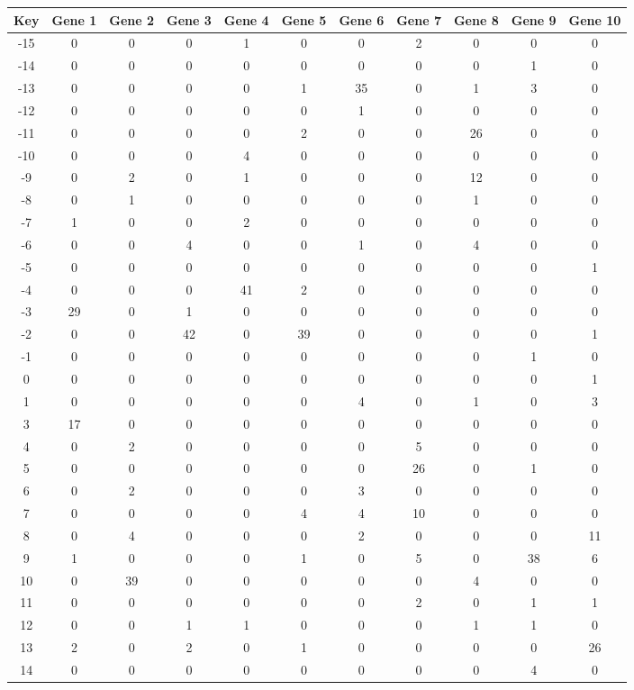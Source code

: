 \begin{tabular}{|c|c|c|c|c|c|c|c|c|c|c|}
\hline
Key & Gene 1 & Gene 2 & Gene 3 & Gene 4 & Gene 5 & Gene 6 & Gene 7 & Gene 8 & Gene 9 & Gene 10 \\
\hline
-15 & 0 & 0 & 0 & 1 & 0 & 0 & 2 & 0 & 0 & 0 \\
-14 & 0 & 0 & 0 & 0 & 0 & 0 & 0 & 0 & 1 & 0 \\
-13 & 0 & 0 & 0 & 0 & 1 & 35 & 0 & 1 & 3 & 0 \\
-12 & 0 & 0 & 0 & 0 & 0 & 1 & 0 & 0 & 0 & 0 \\
-11 & 0 & 0 & 0 & 0 & 2 & 0 & 0 & 26 & 0 & 0 \\
-10 & 0 & 0 & 0 & 4 & 0 & 0 & 0 & 0 & 0 & 0 \\
-9 & 0 & 2 & 0 & 1 & 0 & 0 & 0 & 12 & 0 & 0 \\
-8 & 0 & 1 & 0 & 0 & 0 & 0 & 0 & 1 & 0 & 0 \\
-7 & 1 & 0 & 0 & 2 & 0 & 0 & 0 & 0 & 0 & 0 \\
-6 & 0 & 0 & 4 & 0 & 0 & 1 & 0 & 4 & 0 & 0 \\
-5 & 0 & 0 & 0 & 0 & 0 & 0 & 0 & 0 & 0 & 1 \\
-4 & 0 & 0 & 0 & 41 & 2 & 0 & 0 & 0 & 0 & 0 \\
-3 & 29 & 0 & 1 & 0 & 0 & 0 & 0 & 0 & 0 & 0 \\
-2 & 0 & 0 & 42 & 0 & 39 & 0 & 0 & 0 & 0 & 1 \\
-1 & 0 & 0 & 0 & 0 & 0 & 0 & 0 & 0 & 1 & 0 \\
0 & 0 & 0 & 0 & 0 & 0 & 0 & 0 & 0 & 0 & 1 \\
1 & 0 & 0 & 0 & 0 & 0 & 4 & 0 & 1 & 0 & 3 \\
3 & 17 & 0 & 0 & 0 & 0 & 0 & 0 & 0 & 0 & 0 \\
4 & 0 & 2 & 0 & 0 & 0 & 0 & 5 & 0 & 0 & 0 \\
5 & 0 & 0 & 0 & 0 & 0 & 0 & 26 & 0 & 1 & 0 \\
6 & 0 & 2 & 0 & 0 & 0 & 3 & 0 & 0 & 0 & 0 \\
7 & 0 & 0 & 0 & 0 & 4 & 4 & 10 & 0 & 0 & 0 \\
8 & 0 & 4 & 0 & 0 & 0 & 2 & 0 & 0 & 0 & 11 \\
9 & 1 & 0 & 0 & 0 & 1 & 0 & 5 & 0 & 38 & 6 \\
10 & 0 & 39 & 0 & 0 & 0 & 0 & 0 & 4 & 0 & 0 \\
11 & 0 & 0 & 0 & 0 & 0 & 0 & 2 & 0 & 1 & 1 \\
12 & 0 & 0 & 1 & 1 & 0 & 0 & 0 & 1 & 1 & 0 \\
13 & 2 & 0 & 2 & 0 & 1 & 0 & 0 & 0 & 0 & 26 \\
14 & 0 & 0 & 0 & 0 & 0 & 0 & 0 & 0 & 4 & 0 \\
\hline
\end{tabular}